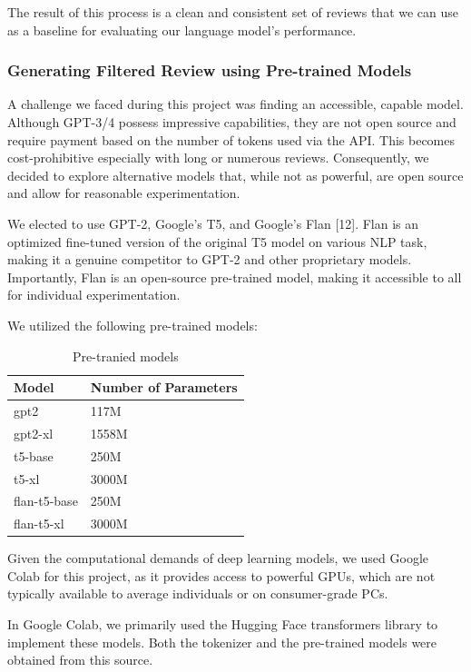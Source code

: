 \documentclass{article}
\begin{document}
The result of this process is a clean and consistent set of reviews that we can use as a baseline for evaluating our language model's performance.


\subsubsection{Generating Filtered Review using Pre-trained Models}

A challenge we faced during this project was finding an accessible, capable model. Although GPT-3/4 possess impressive capabilities, they are not open source and require payment based on the number of tokens used via the API. This becomes cost-prohibitive especially with long or numerous reviews. Consequently, we decided to explore alternative models that, while not as powerful, are open source and allow for reasonable experimentation. 

We elected to use GPT-2, Google's T5, and Google's Flan [12]. Flan is an optimized fine-tuned version of the original T5 model on various NLP task, making it a genuine competitor to GPT-2 and other proprietary models. Importantly, Flan is an open-source pre-trained model, making it accessible to all for individual experimentation.

We utilized the following pre-trained models:

\begin{table}[h]
\centering
\begin{tabular}{ll}
\toprule
\textbf{Model} & \textbf{Number of Parameters} \\
\midrule
gpt2 & 117M\\
gpt2-xl & 1558M\\
t5-base & 250M\\
t5-xl & 3000M\\
flan-t5-base & 250M\\
flan-t5-xl & 3000M \\
\bottomrule
\end{tabular}
\caption{Pre-tranied models}
\end{table}

Given the computational demands of deep learning models, we used Google Colab for this project, as it provides access to powerful GPUs, which are not typically available to average individuals or on consumer-grade PCs. 

In Google Colab, we primarily used the Hugging Face transformers library to implement these models. Both the tokenizer and the pre-trained models were obtained from this source. 
\end{document}
